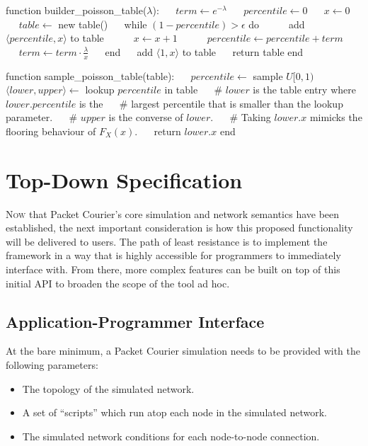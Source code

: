 \begin{algorithm}[caption={Poisson distribution builder and sampler.},label={alg:poisson_builder_and_sampler},
    captionpos=b]
    function builder_poisson_table($\lambda$):
    $\quad$ $term \gets e^{-\lambda}$
    $\quad$ $percentile \gets 0$
    $\quad$ $x \gets 0$
    $\quad$ $table \gets$ new table()
    $\quad$ while $(1 - percentile) > \epsilon$ do
    $\quad$ $\quad$ add $\langle percentile, x \rangle$ to table
    $\quad$ $\quad$ $x \gets x + 1$
    $\quad$ $\quad$ $percentile \gets percentile + term$
    $\quad$ $\quad$ $term \gets term \cdot \frac{\lambda}{x}$
    $\quad$ end
    $\quad$ add  $\langle 1, x \rangle$ to table
    $\quad$ return table
    end

    function sample_poisson_table(table):
    $\quad$ $percentile \gets$ sample $U[0, 1)$
    $\quad$ $\langle lower, upper \rangle \gets$ lookup $percentile$ in table
    $\quad$ # $lower$ is the table entry where $lower.percentile$ is the
    $\quad$ # largest percentile that is smaller than the lookup parameter.
    $\quad$ # $upper$ is the converse of $lower$.
    $\quad$ # Taking $lower.x$ mimicks the flooring behaviour of $F_X(x)$.
    $\quad$ return $lower.x$
    end
\end{algorithm}


\section{Top-Down Specification}

\lettrine{N}{ow} that Packet Courier's core simulation and network semantics have been established, the next
important consideration is how this proposed functionality will be delivered to users. The path of least resistance
is to implement the framework in a way that is highly accessible for programmers to immediately interface with. From
there, more complex features can be built on top of this initial API to broaden the scope of the tool ad hoc.

\subsection{Application-Programmer Interface}

At the bare minimum, a Packet Courier simulation needs to be provided with the following parameters:
\begin{itemize}
    \item The topology of the simulated network.
    \item A set of ``scripts'' which run atop each node in the simulated network.
    \item The simulated network conditions for each node-to-node connection.
\end{itemize}

